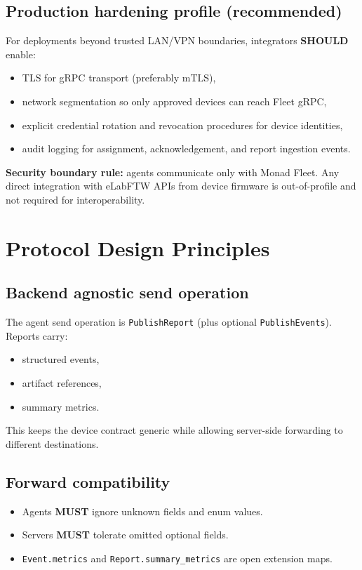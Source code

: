 \documentclass[11pt,a4paper]{article}
\begin{document}
\subsection{Production hardening profile (recommended)}
For deployments beyond trusted LAN/VPN boundaries, integrators \textbf{SHOULD} enable:
\begin{itemize}
  \item TLS for gRPC transport (preferably mTLS),
  \item network segmentation so only approved devices can reach Fleet gRPC,
  \item explicit credential rotation and revocation procedures for device identities,
  \item audit logging for assignment, acknowledgement, and report ingestion events.
\end{itemize}

\textbf{Security boundary rule:}
agents communicate only with Monad Fleet.
Any direct integration with eLabFTW APIs from device firmware is out-of-profile and not required for interoperability.

\section{Protocol Design Principles}
\subsection{Backend agnostic send operation}
The agent send operation is \texttt{PublishReport} (plus optional \texttt{PublishEvents}).
Reports carry:
\begin{itemize}
  \item structured events,
  \item artifact references,
  \item summary metrics.
\end{itemize}

This keeps the device contract generic while allowing server-side forwarding to different destinations.

\subsection{Forward compatibility}
\begin{itemize}
  \item Agents \textbf{MUST} ignore unknown fields and enum values.
  \item Servers \textbf{MUST} tolerate omitted optional fields.
  \item \texttt{Event.metrics} and \texttt{Report.summary\_metrics} are open extension maps.
\end{itemize}
\end{document}
